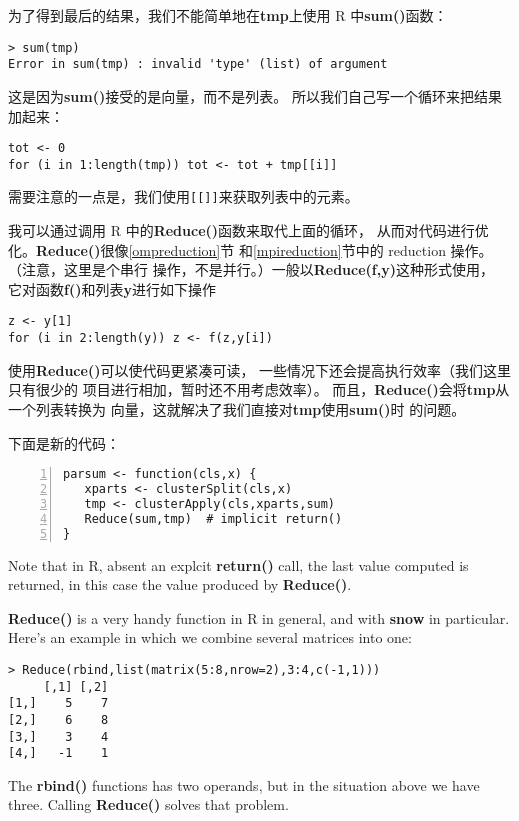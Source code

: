 为了得到最后的结果，我们不能简单地在{\bf tmp}上使用 R 中{\bf sum()}函数：

\begin{lstlisting}
> sum(tmp)
Error in sum(tmp) : invalid 'type' (list) of argument
\end{lstlisting}

这是因为{\bf sum()}接受的是向量，而不是列表。
所以我们自己写一个循环来把结果加起来：

\begin{lstlisting}
tot <- 0
for (i in 1:length(tmp)) tot <- tot + tmp[[i]]
\end{lstlisting}

需要注意的一点是，我们使用\texttt{[[]]}来获取列表中的元素。

我可以通过调用 R 中的{\bf Reduce()}函数来取代上面的循环，
从而对代码进行优化。{\bf Reduce()}很像\ref{ompreduction}节
和\ref{mpireduction}节中的 reduction 操作。（注意，这里是个串行
操作，不是并行。）一般以{\bf Reduce(f,y)}这种形式使用，
它对函数{\bf f()}和列表{\bf y}进行如下操作
\begin{lstlisting}
z <- y[1]
for (i in 2:length(y)) z <- f(z,y[i])
\end{lstlisting}

使用{\bf Reduce()}可以使代码更紧凑可读，
一些情况下还会提高执行效率（我们这里只有很少的
项目进行相加，暂时还不用考虑效率）。
而且，{\bf Reduce()}会将{\bf tmp}从一个列表转换为
向量，这就解决了我们直接对{\bf tmp}使用{\bf sum()}时
的问题。

下面是新的代码：

\begin{lstlisting}[numbers=left]
parsum <- function(cls,x) {
   xparts <- clusterSplit(cls,x)
   tmp <- clusterApply(cls,xparts,sum)
   Reduce(sum,tmp)  # implicit return()
}
\end{lstlisting}

Note that in R, absent an explcit {\bf return()} call, the last value
computed is returned, in this case the value produced by {\bf Reduce()}.

{\bf Reduce()} is a very handy function in R in general, and with {\bf
snow} in particular.  Here's an example in which we combine several
matrices into one:

\begin{lstlisting}
> Reduce(rbind,list(matrix(5:8,nrow=2),3:4,c(-1,1)))
     [,1] [,2]
[1,]    5    7
[2,]    6    8
[3,]    3    4
[4,]   -1    1
\end{lstlisting}

The {\bf rbind()} functions has two operands, but in the situation above
we have three.  Calling {\bf Reduce()} solves that problem.

